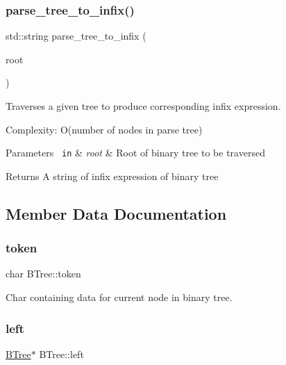 \subsubsection{\texorpdfstring{parse\+\_\+tree\+\_\+to\+\_\+infix()}{parse\_tree\_to\_infix()}}
{\footnotesize\ttfamily std\+::string parse\+\_\+tree\+\_\+to\+\_\+infix (\begin{DoxyParamCaption}\item[{\mbox{\hyperlink{classBTree}{B\+Tree}} $\ast$}]{root }\end{DoxyParamCaption})\hspace{0.3cm}{\ttfamily [related]}}



Traverses a given tree to produce corresponding infix expression. 

Complexity\+: O(number of nodes in parse tree) 
\begin{DoxyParams}[1]{Parameters}
\mbox{\texttt{ in}}  & {\em root} & Root of binary tree to be traversed \\
\hline
\end{DoxyParams}
\begin{DoxyReturn}{Returns}
A string of infix expression of binary tree 
\end{DoxyReturn}


\subsection{Member Data Documentation}
\mbox{\label{classBTree_a3d5016b19ab621d5c61cf633ec012a72}} 
\subsubsection{\texorpdfstring{token}{token}}
{\footnotesize\ttfamily char B\+Tree\+::token}



Char containing data for current node in binary tree. 

\mbox{\label{classBTree_ad7e7d928a099c40fbd0d323f76d7cf18}} 
\subsubsection{\texorpdfstring{left}{left}}
{\footnotesize\ttfamily \mbox{\hyperlink{classBTree}{B\+Tree}}$\ast$ B\+Tree\+::left}



